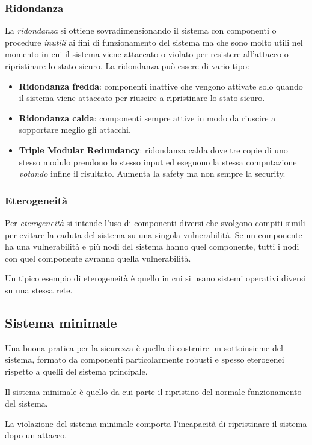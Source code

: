 \subsubsection{Ridondanza}
La \emph{ridondanza} si ottiene sovradimensionando il sistema con componenti o procedure \emph{inutili} ai fini di
funzionamento del sistema ma che sono molto utili nel momento in cui il sistema viene attaccato o violato per
resistere all'attacco o ripristinare lo stato sicuro. La ridondanza può essere di vario tipo:
\begin{itemize}
	\item \textbf{Ridondanza fredda}: componenti inattive che vengono attivate solo quando il sistema viene attaccato
	      per riuscire a ripristinare lo stato sicuro.
	\item \textbf{Ridondanza calda}: componenti sempre attive in modo da riuscire a sopportare meglio gli attacchi.
	\item \textbf{Triple Modular Redundancy}: ridondanza calda dove tre copie di uno stesso modulo prendono lo stesso
	      input ed eseguono la stessa computazione \emph{votando} infine il risultato. Aumenta la safety ma non sempre
	      la security.
\end{itemize}

\subsubsection{Eterogeneità}
Per \emph{eterogeneità} si intende l'uso di componenti diversi che svolgono compiti simili per evitare la caduta del
sistema su una singola vulnerabilità. Se un componente ha una vulnerabilità e più nodi del sistema hanno quel
componente, tutti i nodi con quel componente avranno quella vulnerabilità.

Un tipico esempio di eterogeneità è quello in cui si usano sistemi operativi diversi su una stessa rete.

\subsection{Sistema minimale}
Una buona pratica per la sicurezza è quella di costruire un sottoinsieme del sistema, formato da componenti
particolarmente robusti e spesso eterogenei rispetto a quelli del sistema principale.

Il sistema minimale è quello da cui parte il ripristino del normale funzionamento del sistema.

La violazione del sistema minimale comporta l'incapacità di ripristinare il sistema dopo un attacco.

